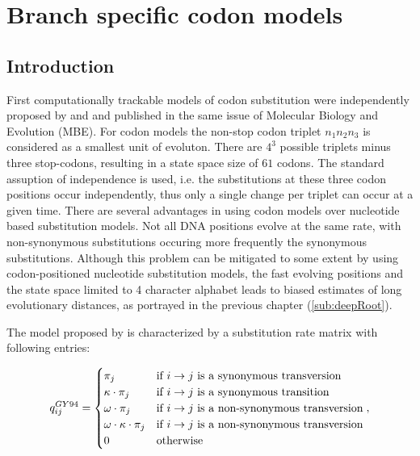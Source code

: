 \chapter{Branch specific codon models}

\section{Introduction}

First computationally trackable models of codon substitution were independently proposed by \cite{Muse1994} and \cite{Goldman1994} and published in the same issue of Molecular Biology and Evolution (MBE).
For codon models the non-stop codon triplet $n_{1}n_{2}n_{3}$ is considered as a smallest unit of evoluton.
There are $4^3$ possible triplets minus three stop-codons, resulting in a state space size of $61$ codons.
The standard assuption of independence is used, i.e. the substitutions at these three codon positions occur independently, thus only a single change per triplet can occur at a given time.
There are several advantages in using codon models over nucleotide based substitution models.
Not all DNA positions evolve at the same rate, with non-synonymous substitutions occuring more frequently the synonymous substitutions.
Although this problem can be mitigated to some extent by using codon-positioned nucleotide substitution models, the fast evolving positions and the state space limited to 4 character alphabet leads to biased estimates of long evolutionary distances, as portrayed in the previous chapter (\ref{sub:deepRoot}).

The model proposed by \cite{Goldman1994} is characterized by a substitution rate matrix with following entries:

\begin{equation}
q_{ij}^{GY94}=\begin{cases}
\pi_{j} & \text{if \ensuremath{i\rightarrow j} is a synonymous transversion}\\
\kappa\cdot\pi_{j} & \text{if \ensuremath{i\rightarrow j} is a synonymous transition}\\
\omega\cdot\pi_{j} & \text{if \ensuremath{i\rightarrow j} is a non-synonymous transversion}\\
\omega\cdot\kappa\cdot\pi_{j} & \text{if \ensuremath{i\rightarrow j} is a non-synonymous transversion}\\
0 & \text{otherwise}
\end{cases},
\label{eq:gy94}
\end{equation}

